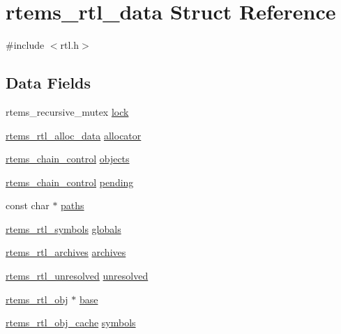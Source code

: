 \hypertarget{structrtems__rtl__data}{}\section{rtems\+\_\+rtl\+\_\+data Struct Reference}
\label{structrtems__rtl__data}


{\ttfamily \#include $<$rtl.\+h$>$}

\subsection*{Data Fields}
\begin{DoxyCompactItemize}
\item 
rtems\+\_\+recursive\+\_\+mutex \mbox{\hyperlink{structrtems__rtl__data_a4bb9f63ecfcc207f9c7bd6e1cfdd544f}{lock}}
\item 
\mbox{\hyperlink{structrtems__rtl__alloc__data}{rtems\+\_\+rtl\+\_\+alloc\+\_\+data}} \mbox{\hyperlink{structrtems__rtl__data_ab52a733bfe03f01dfafd6fc88d2beea6}{allocator}}
\item 
\mbox{\hyperlink{unionChain__Control}{rtems\+\_\+chain\+\_\+control}} \mbox{\hyperlink{structrtems__rtl__data_adce98c74f517d66d5214fb2767fe0fe6}{objects}}
\item 
\mbox{\hyperlink{unionChain__Control}{rtems\+\_\+chain\+\_\+control}} \mbox{\hyperlink{structrtems__rtl__data_a7e3fad5f57f980a117ea8933213e4f25}{pending}}
\item 
const char $\ast$ \mbox{\hyperlink{structrtems__rtl__data_ad0fb22f730c79bd6066b2de85f3f81e5}{paths}}
\item 
\mbox{\hyperlink{structrtems__rtl__symbols}{rtems\+\_\+rtl\+\_\+symbols}} \mbox{\hyperlink{structrtems__rtl__data_a5deddd96d70a31534ba44b1a10b3242d}{globals}}
\item 
\mbox{\hyperlink{structrtems__rtl__archives}{rtems\+\_\+rtl\+\_\+archives}} \mbox{\hyperlink{structrtems__rtl__data_a84accfc67887c355934fd018fdf3dcab}{archives}}
\item 
\mbox{\hyperlink{structrtems__rtl__unresolved}{rtems\+\_\+rtl\+\_\+unresolved}} \mbox{\hyperlink{structrtems__rtl__data_aa020bb1fec139cbc15a1e6bc53f397d1}{unresolved}}
\item 
\mbox{\hyperlink{structrtems__rtl__obj}{rtems\+\_\+rtl\+\_\+obj}} $\ast$ \mbox{\hyperlink{structrtems__rtl__data_af955eef3c81a18c5da2a4f4ba9058317}{base}}
\item 
\mbox{\hyperlink{structrtems__rtl__obj__cache}{rtems\+\_\+rtl\+\_\+obj\+\_\+cache}} \mbox{\hyperlink{structrtems__rtl__data_a82b192191cbad1302e7cd556b284cc30}{symbols}}

\end{DoxyCompactItemize}
